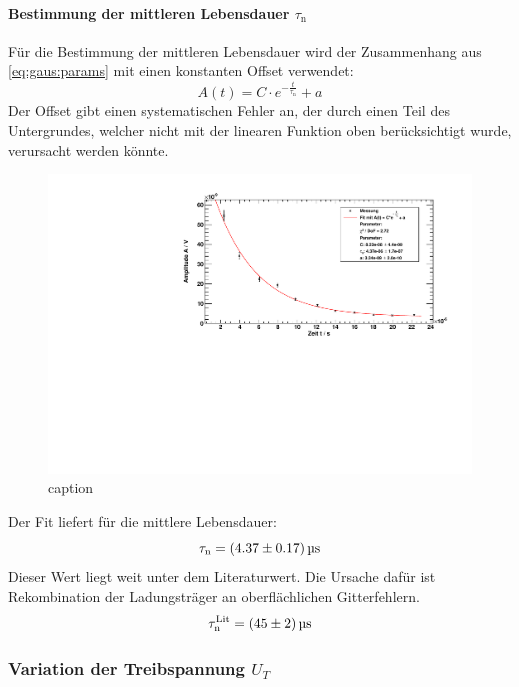 \paragraph{Bestimmung der mittleren Lebensdauer $\tau_\text{n}$}
Für die Bestimmung der mittleren Lebensdauer wird der Zusammenhang aus \autoref{eq:gaus:params} mit einen konstanten Offset verwendet:
\begin{equation}
  A(t) = C \cdot e^{- \frac{t}{\tau_\text{n}}} + a
\end{equation}
Der Offset gibt einen systematischen Fehler an, der durch einen Teil des Untergrundes, welcher nicht mit der linearen Funktion oben 
berücksichtigt wurde, verursacht werden könnte.

\begin{figure}[H]
\begin{center}
  \includegraphics[width=\textwidth]{../img/part2/dist_fitA.pdf}
  \caption{caption}
  \label{img:dist:fita}
\end{center}
\end{figure}
Der Fit liefert für die mittlere Lebensdauer:
\begin{equation}
  \tau_\text{n} = (4.37 \pm 0.17)\,\text{\textmu s}
\end{equation}
Dieser Wert liegt weit unter dem Literaturwert. Die Ursache dafür ist Rekombination der Ladungsträger an oberflächlichen Gitterfehlern.
\begin{equation}
  \tau_\text{n}^\text{Lit} = (45 \pm 2)\,\text{\textmu s}
\end{equation}


\subsubsection{Variation der Treibspannung \texorpdfstring{$U_T$}{U\_T}}

